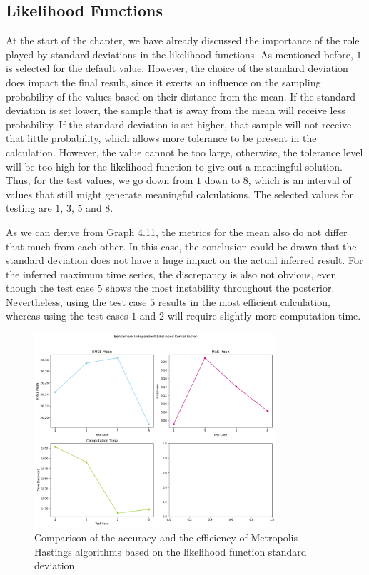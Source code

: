 \subsection{Likelihood Functions}
At the start of the chapter, we have already discussed the importance of the role played by standard deviations in the likelihood functions. As mentioned before, $1$ is selected for the default value. However, the choice of the standard deviation does impact the final result, since it exerts an influence on the sampling probability of the values based on their distance from the mean. If the standard deviation is set lower, the sample that is away from the mean will receive less probability. If the standard deviation is set higher, that sample will not receive that little probability, which allows more tolerance to be present in the calculation. However, the value cannot be too large, otherwise, the tolerance level will be too high for the likelihood function to give out a meaningful solution. Thus, for the test values, we go down from $1$ down to $8$, which is an interval of values that still might generate meaningful calculations. The selected values for testing are $1$, $3$, $5$ and $8$. 

As we can derive from Graph 4.11, the metrics for the mean also do not differ that much from each other. In this case, the conclusion could be drawn that the standard deviation does not have a huge impact on the actual inferred result. For the inferred maximum time series, the discrepancy is also not obvious, even though the test case $5$ shows the most instability throughout the posterior. Nevertheless, using the test case $5$ results in the most efficient calculation, whereas using the test cases $1$ and $2$ will require slightly more computation time.


\begin{figure}
    \centering
    \includegraphics[width=0.8\textwidth]{figures/basic_mh/benchmark/sensitivity_likelihood_independent.png}
    \captionsetup{width=.8\textwidth}
    \caption{Comparison of the accuracy and the efficiency of Metropolis Hastings algorithms based on the likelihood function standard deviation}
    \label{fig:enter-label}
\end{figure}



